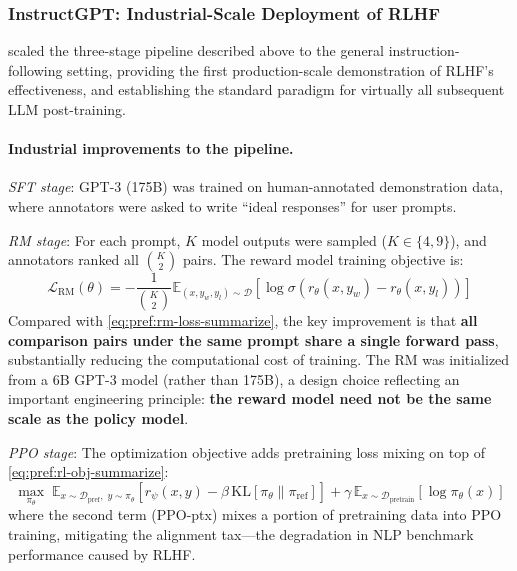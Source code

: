 \subsubsection{InstructGPT: Industrial-Scale Deployment of RLHF}
\label{sec:t2-instructgpt}

 scaled the three-stage pipeline described above to the general instruction-following setting,
providing the first production-scale demonstration of RLHF's effectiveness,
and establishing the standard paradigm for virtually all subsequent LLM post-training.

\paragraph{Industrial improvements to the pipeline.}

\textit{SFT stage}:
GPT-3 (175B) was trained on human-annotated demonstration data,
where annotators were asked to write ``ideal responses'' for user prompts.

\textit{RM stage}:
For each prompt, $K$ model outputs were sampled ($K \in \{4, 9\}$),
and annotators ranked all $\binom{K}{2}$ pairs.
The reward model training objective is:
\begin{equation}
\label{eq:pref:rm-loss-instructgpt}
\mathcal{L}_{\text{RM}}(\theta) = -\frac{1}{\binom{K}{2}} \mathbb{E}_{(x, y_w, y_l) \sim \mathcal{D}} \left[
  \log \sigma\!\left(r_\theta(x, y_w) - r_\theta(x, y_l)\right)
\right]
\end{equation}
Compared with \cref{eq:pref:rm-loss-summarize}, the key improvement is that
\textbf{all comparison pairs under the same prompt share a single forward pass},
substantially reducing the computational cost of training.
The RM was initialized from a 6B GPT-3 model (rather than 175B),
a design choice reflecting an important engineering principle:
\textbf{the reward model need not be the same scale as the policy model}.

\textit{PPO stage}:
The optimization objective adds pretraining loss mixing on top of \cref{eq:pref:rl-obj-summarize}:
\begin{equation}
\label{eq:pref:ppo-ptx}
\max_{\pi_\theta}\; \mathbb{E}_{x \sim \mathcal{D}_{\text{pref}},\; y \sim \pi_\theta}
  \left[r_\psi(x, y) - \beta \,\text{KL}\!\left[\pi_\theta \| \pi_{\text{ref}}\right]\right]
  + \gamma\,\mathbb{E}_{x \sim \mathcal{D}_{\text{pretrain}}}\left[\log \pi_\theta(x)\right]
\end{equation}
where the second term (PPO-ptx) mixes a portion of pretraining data into PPO training,
mitigating the alignment tax---the degradation in NLP benchmark performance caused by RLHF.

